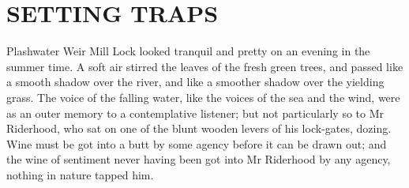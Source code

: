
\chapter{SETTING TRAPS}

Plashwater Weir Mill Lock looked tranquil and pretty on an evening in
the summer time. A soft air stirred the leaves of the fresh green trees,
and passed like a smooth shadow over the river, and like a smoother
shadow over the yielding grass. The voice of the falling water, like
the voices of the sea and the wind, were as an outer memory to a
contemplative listener; but not particularly so to Mr Riderhood, who sat
on one of the blunt wooden levers of his lock-gates, dozing. Wine must
be got into a butt by some agency before it can be drawn out; and the
wine of sentiment never having been got into Mr Riderhood by any agency,
nothing in nature tapped him.


